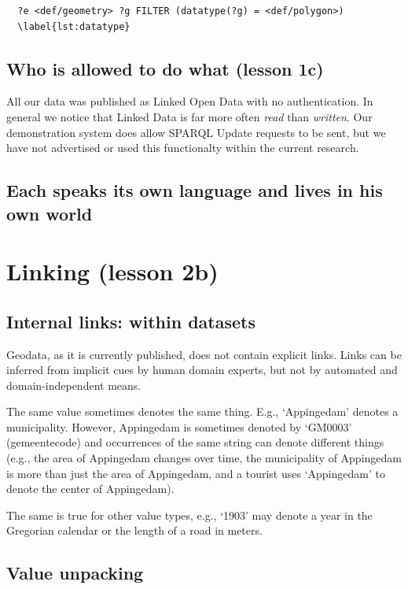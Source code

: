 \documentclass[a4paper]{scrartcl}
\begin{document}
\begin{verbatim}
  ?e <def/geometry> ?g FILTER (datatype(?g) = <def/polygon>)
  \label{lst:datatype}
\end{verbatim}


\subsection{Who is allowed to do what (lesson 1c)}

All our data was published as Linked Open Data with no authentication.
In general we notice that Linked Data is far more often \emph{read}
than \emph{written}.  Our demonstration system does allow SPARQL
Update requests to be sent, but we have not advertised or used this
functionalty within the current research.


\subsection{Each speaks its own language and lives in his own world}


\section{Linking (lesson 2b)}

\subsection{Internal links: within datasets}

Geodata, as it is currently published, does not contain explicit
links.  Links can be inferred from implicit cues by human domain
experts, but not by automated and domain-independent means.

The same value sometimes denotes the same thing.  E.g., `Appingedam'
denotes a municipality.  However, Appingedam is sometimes denoted by
`GM0003' (gemeentecode) and occurrences of the same string can denote
different things (e.g., the area of Appingedam changes over time, the
municipality of Appingedam is more than just the area of Appingedam,
and a tourist uses `Appingedam' to denote the center of Appingedam).

The same is true for other value types, e.g., `1903' may denote a year
in the Gregorian calendar or the length of a road in meters.  


\subsection{Value unpacking}
\end{document}
